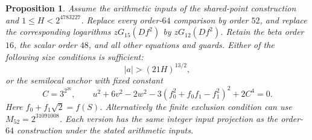 \documentclass[11pt]{article}
\newtheorem{proposition}[theorem]{Proposition}
\theoremstyle{definition}
\begin{document}
\begin{proposition}\label{prop:shared-precision52}
Assume the arithmetic inputs of the shared-point construction and
$1\le H<2^{4783227}$.  Replace every order-$64$ comparison by order
$52$, and replace the corresponding logarithms $zG_{15}(Df^2)$ by
$zG_{12}(Df^2)$.  Retain the beta order $16$, the scalar order $48$,
and all other equations and guards.  Either of the following size
conditions is sufficient:
\[
 |a|>(21H)^{13/2},
\]
or the semilocal anchor with fixed constant
\[
 C=3^{2^{26}},\qquad
 u^2+6v^2-2w^2-3(f_0^2+f_0f_1-f_1^2)^2+2C^4=0.
\]
Here $f_0+f_1\sqrt2=f(S)$.  Alternatively the finite exclusion
condition can use $M_{52}=2^{31091008}$.  Each version has the same
integer input projection as the order-$64$ construction under the
stated arithmetic inputs.
\end{proposition}
\end{document}
